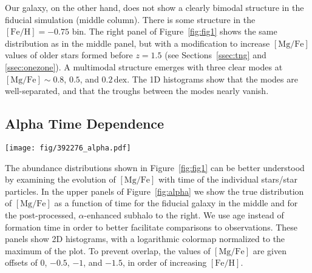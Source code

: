 \documentclass[twocolumn]{aastex631}
\newcommand{\Gyr}{\ensuremath{\textrm{Gyr}}}
\newcommand{\FeH}{\ensuremath{[\textrm{Fe}/\textrm{H}]}}
\newcommand{\MgFe}{\ensuremath{[\textrm{Mg}/\textrm{Fe}]}}
\newcommand{\dex}{\ensuremath{\textrm{dex}}}
\begin{document}
Our galaxy, on the other hand, does not show a clearly bimodal structure in the fiducial simulation (middle column). There is some structure in the $\FeH=-0.75$ bin. The right panel of Figure~\ref{fig:fig1} shows the same distribution as in the middle panel, but with a modification to increase \MgFe{} values of older stars formed before $z=1.5$ (see Sections~\ref{ssec:tng} and \ref{ssec:onezone}). A multimodal structure emerges with three clear modes at $\MgFe\sim0.8$, $0.5$, and $0.2\,\dex$. The 1D histograms show that the modes are well-separated, and that the troughs between the modes nearly vanish.

\subsection{Alpha Time Dependence}\label{ssec:alpha_time}

\begin{figure*}
  \centering
  \texttt{[image: fig/392276\_alpha.pdf]}
  \caption{\textbf{Bimodality in the abundance plane is linked to distinct epochs in simulation.} The upper panels show \MgFe{} as a function of age for our subhalo in TNG. The colors indicate stellar populations at fixed values of \FeH{}, which are the same as in Figure~\ref{fig:fig1}. A gap in the relation occurs at an age of approximately $10.6\,\Gyr$, which we indicate with a vertical dashed line. The effect of the $\alpha$-enhancement is clear, as it separates the stars that form before and after this gap in ages (star particles which formed before $z=1.5$ are $\alpha$-enhanced, which occurs at an age of $\sim9.5\,\Gyr$). The lower panels show on the left the Milky Way and on the center and right the data from TNG but with $12.5\%$ age errors and $0.01\,\dex$ errors in \MgFe{}. When the simulations are given these errors, we see that the before and after star particles smear such that the two populations significantly overlap in ages. In the $\alpha$-enhanced galaxy, two populations emerge in each bin which overlapped in the fiducial distribution. This feature more closely resembles the Milky Way, which displays such populations where the bimodality is strongest -- $\FeH=-0.5$ (blue) and $-0.25$ (orange).}
  \label{fig:alpha}
\end{figure*}

The abundance distributions shown in Figure~\ref{fig:fig1} can be better understood by examining the evolution of \MgFe{} with time of the individual stars/star particles. In the upper panels of Figure~\ref{fig:alpha} we show the true distribution of \MgFe{} as a function of time for the fiducial galaxy in the middle and for the post-processed, $\alpha$-enhanced subhalo to the right. We use age instead of formation time in order to better facilitate comparisons to observations. These panels show 2D histograms, with a logarithmic colormap normalized to the maximum of the plot. To prevent overlap, the values of \MgFe{} are given offsets of $0$, $-0.5$, $-1$, and $-1.5$, in order of increasing \FeH{}.
\end{document}
